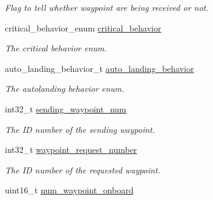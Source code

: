 \begin{DoxyCompactItemize}
\begin{DoxyCompactList}\small\item\em Flag to tell whether waypoint are being received or not. \end{DoxyCompactList}\item 
\hypertarget{structmavlink__waypoint__handler__t_a22c1ecfbf8cc65f4ed36e6a07aa7fd28}{critical\+\_\+behavior\+\_\+enum \hyperlink{structmavlink__waypoint__handler__t_a22c1ecfbf8cc65f4ed36e6a07aa7fd28}{critical\+\_\+behavior}}\label{structmavlink__waypoint__handler__t_a22c1ecfbf8cc65f4ed36e6a07aa7fd28}

\begin{DoxyCompactList}\small\item\em The critical behavior enum. \end{DoxyCompactList}\item 
\hypertarget{structmavlink__waypoint__handler__t_ae96b7d1462d9a3267e7952fef2e2fd59}{auto\+\_\+landing\+\_\+behavior\+\_\+t \hyperlink{structmavlink__waypoint__handler__t_ae96b7d1462d9a3267e7952fef2e2fd59}{auto\+\_\+landing\+\_\+behavior}}\label{structmavlink__waypoint__handler__t_ae96b7d1462d9a3267e7952fef2e2fd59}

\begin{DoxyCompactList}\small\item\em The autolanding behavior enum. \end{DoxyCompactList}\item 
\hypertarget{structmavlink__waypoint__handler__t_a5a5830856412717ea245adc03f387cf3}{int32\+\_\+t \hyperlink{structmavlink__waypoint__handler__t_a5a5830856412717ea245adc03f387cf3}{sending\+\_\+waypoint\+\_\+num}}\label{structmavlink__waypoint__handler__t_a5a5830856412717ea245adc03f387cf3}

\begin{DoxyCompactList}\small\item\em The I\+D number of the sending waypoint. \end{DoxyCompactList}\item 
\hypertarget{structmavlink__waypoint__handler__t_aff6085039add0d1b288b88c6fef4af99}{int32\+\_\+t \hyperlink{structmavlink__waypoint__handler__t_aff6085039add0d1b288b88c6fef4af99}{waypoint\+\_\+request\+\_\+number}}\label{structmavlink__waypoint__handler__t_aff6085039add0d1b288b88c6fef4af99}

\begin{DoxyCompactList}\small\item\em The I\+D number of the requested waypoint. \end{DoxyCompactList}\item 
\hypertarget{structmavlink__waypoint__handler__t_ae7eb90ecb6f9cac186e40d61d73dfc11}{uint16\+\_\+t \hyperlink{structmavlink__waypoint__handler__t_ae7eb90ecb6f9cac186e40d61d73dfc11}{num\+\_\+waypoint\+\_\+onboard}}\label{structmavlink__waypoint__handler__t_ae7eb90ecb6f9cac186e40d61d73dfc11}


\end{DoxyCompactItemize}
